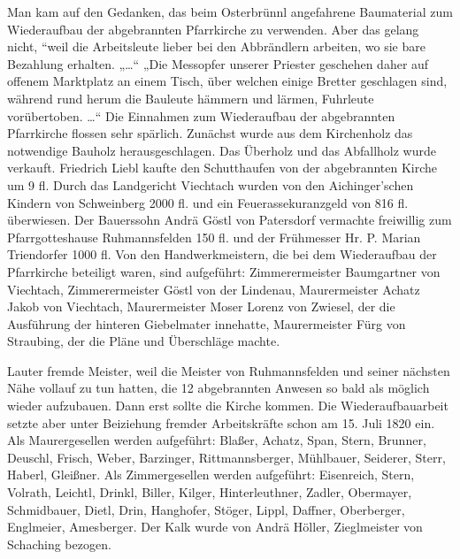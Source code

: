 \documentclass[12pt,a4paper]{book}
\begin{document}
Man kam auf den Gedanken, das beim Osterbrünnl angefahrene Baumaterial zum
Wiederaufbau der abgebrannten Pfarrkirche zu verwenden. Aber das gelang nicht,
“weil die Arbeitsleute lieber bei den Abbrändlern arbeiten, wo sie bare
Bezahlung erhalten. „…“ „Die Messopfer unserer Priester geschehen daher auf
offenem Marktplatz an einem Tisch, über welchen einige Bretter geschlagen sind,
während rund herum die Bauleute hämmern und lärmen, Fuhrleute vorübertoben. …“
Die Einnahmen zum Wiederaufbau der abgebrannten Pfarrkirche flossen sehr
spärlich. Zunächst wurde aus dem Kirchenholz das notwendige Bauholz
herausgeschlagen. Das Überholz und das Abfallholz wurde verkauft. Friedrich
Liebl kaufte den Schutthaufen von der abgebrannten Kirche um 9 fl. Durch das
Landgericht Viechtach wurden von den Aichinger'schen Kindern von Schweinberg
2000 fl. und ein Feuerassekuranzgeld von 816 fl. überwiesen. Der Bauerssohn
Andrä Göstl von Patersdorf vermachte freiwillig zum Pfarrgotteshause
Ruhmannsfelden 150 fl. und der Frühmesser Hr. P. Marian Triendorfer 1000 fl. Von
den Handwerkmeistern, die bei dem Wiederaufbau der Pfarrkirche beteiligt waren,
sind aufgeführt: Zimmerermeister Baumgartner von Viechtach, Zimmerermeister
Göstl von der Lindenau, Maurermeister Achatz Jakob von Viechtach, Maurermeister
Moser Lorenz von Zwiesel, der die Ausführung der hinteren Giebelmater innehatte,
Maurermeister Fürg von Straubing, der die Pläne und Überschläge machte.

Lauter fremde Meister, weil die Meister von Ruhmannsfelden und seiner nächsten
Nähe vollauf zu tun hatten, die 12 abgebrannten Anwesen so bald als möglich
wieder aufzubauen. Dann erst sollte die Kirche kommen. Die Wiederaufbauarbeit
setzte aber unter Beiziehung fremder Arbeitskräfte schon am 15. Juli 1820 ein.
Als Maurergesellen werden aufgeführt: Blaßer, Achatz, Span, Stern, Brunner,
Deuschl, Frisch, Weber, Barzinger, Rittmannsberger, Mühlbauer, Seiderer, Sterr,
Haberl, Gleißner. Als Zimmergesellen werden aufgeführt: Eisenreich, Stern,
Volrath, Leichtl, Drinkl, Biller, Kilger, Hinterleuthner, Zadler, Obermayer,
Schmidbauer, Dietl, Drin, Hanghofer, Stöger, Lippl, Daffner, Oberberger,
Englmeier, Amesberger. Der Kalk wurde von Andrä Höller, Zieglmeister von
Schaching bezogen.
\end{document}
